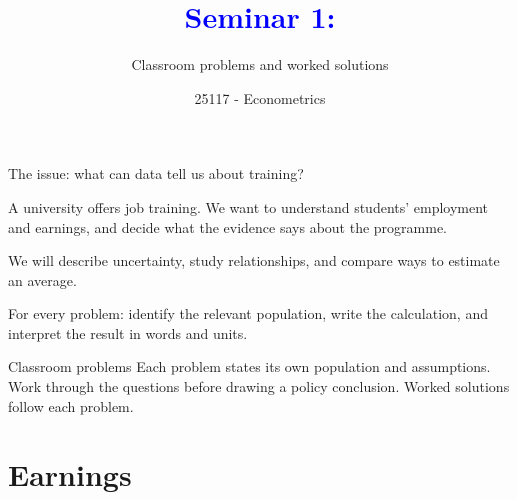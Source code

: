 \documentclass[notes,10pt, aspectratio=169]{beamer}
\title[]{\textcolor{blue}{Seminar 1:}}
\subtitle{Classroom problems and worked solutions}
\author{25117 - Econometrics}
\institute[shortinst]{Universitat Pompeu Fabra}
\newenvironment{wideitemize}{\itemize\addtolength{\itemsep}{10pt}}{\enditemize}
\begin{document}
\begin{frame}[plain]
\maketitle
\end{frame}

\begin{frame}{The issue: what can data tell us about training?}
\begin{wideitemize}
\item A university offers job training. We want to understand students' employment and earnings, and decide what the evidence says about the programme.
\item We will describe uncertainty, study relationships, and compare ways to estimate an average.
\item For every problem: identify the relevant population, write the calculation, and interpret the result in words and units.
\end{wideitemize}
\begin{exampleblock}{Classroom problems}
Each problem states its own population and assumptions. Work through the questions before drawing a policy conclusion. Worked solutions follow each problem.
\end{exampleblock}
\end{frame}

\section{Earnings}
\end{document}
